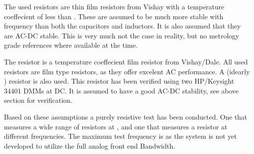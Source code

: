 The used resistors are  thin film resistors from Vishay with a temperature coeffecient of less than . These are assumed to be much more stable with frequency than both the capacitors and inductors. It is also assumed that they are AC-DC stable. This is very much not the case in reality, but no metrology grade references where available at the time.

The  resistor is a   temperature coeffecient film resistor from Vishay/Dale. All used resistors are film type resistors, as they offer excelent AC performance. A  (idearly ) resistor is also used. This resistor has been verified using two HP/Keysight 34401 DMMs at DC. It is assumed to have a good AC-DC stability, see above section for verification.

Based on these assumptions a purely resistive test has been conducted. One that measures a wide range of resistors at , and one that measures a  resistor at different frequencies. The maximum test frequency is  as the system is not yet developed to utilize the full  analog front end Bandwidth.


